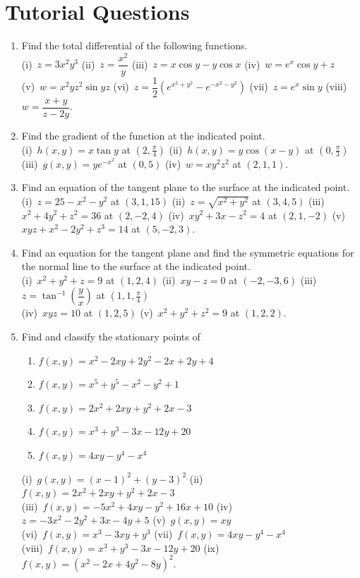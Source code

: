 \documentclass[titlepage,a4paper,12pt]{report}
\begin{document}
\section{Tutorial Questions}
\begin{enumerate}
\item Find the total differential of the following functions.\\
(i)\, $z=3x^2y^3$ \quad (ii)\, $z=\dfrac{x^2}{y}$ \quad (iii)\, $z=x\cos y-y\cos x $ \quad (iv)\, $w=e^x\cos y +z$ \\ (v)\, $w=x^2yz^2\sin yz$ \quad (vi)\, $z=\dfrac{1}{2}(e^{x^2+y^2}-e^{-x^2-y^2})$ \quad (vii)\, $z=e^x\sin y$ \quad (viii)\, $w=\dfrac{x+y}{z-2y}$.
\item Find the gradient of the function at the indicated point.\\
  (i)\, $h(x,y)=x\tan y$ at $(2, \frac{\pi}{4})$ \quad (ii)\, $h(x,y)=y\cos (x-y)$ at $(0, \frac{\pi}{3})$ \quad (iii)\, $g(x,y)=ye^{-x^2}$ at $(0,5)$ \quad (iv)\, $w=xy^2z^2$ at $(2,1,1)$.
  \item Find an equation of the tangent plane to the surface at the indicated point.\\
  (i)\, $z=25-x^2-y^2$ at $(3,1,15)$ \quad (ii)\, $z=\sqrt{x^2+y^2}$ at $(3,4,5)$ \quad (iii)\, $x^2+4y^2+z^2=36$ at $(2,-2,4)$ \quad (iv)\, $xy^2+3x-z^2=4$ at $(2,1,-2)$ \quad (v)\, $xyz+x^2-2y^2+z^3=14$ at $(5,-2,3)$.
  \item Find an equation for the tangent plane and find the symmetric equations for the normal line to the surface at the indicated point.\\
  (i)\, $x^2+y^2+z=9$ at $(1,2,4)$ \quad (ii)\, $xy-z=0$ at $(-2,-3, 6)$ \quad (iii)\,  $z=\tan ^{-1}\left(\dfrac{y}{x}\right)$ at $(1,1,\frac{\pi}{4})$\\
  (iv)\, $xyz=10$ at $(1,2,5)$ \quad (v)\, $x^2+y^2+z^2=9$ at $(1,2,2)$.
  \item Find and classify the stationary points of
  \begin{enumerate}
  \item $f(x,y)=x^2-2xy+2y^2-2x+2y+4$
  \item $f(x,y)=x^5+y^5-x^2-y^2+1$
  \item $f(x,y)=2x^2+2xy+y^2+2x-3$
  \item $f(x,y)=x^3+y^3-3x-12y+20$
  \item $f(x,y)=4xy-y^4-x^4$
  \end{enumerate}
  (i)\, $g(x,y)=(x-1)^2+(y-3)^2$ \quad (ii)\, $f(x,y)=2x^2+2xy+y^2+2x-3$ \\ (iii)\, $f(x,y)=-5x^2+4xy-y^2+16x+10$ \quad (iv)\, $z=-3x^2-2y^2+3x-4y+5$ \quad (v)\, $g(x,y)=xy$ \\ (vi)\, $f(x,y)=x^3-3xy+y^3$ \quad (vii)\, $f(x,y)=4xy-y^4-x^4$ \\ (viii)\, $f(x,y)=x^3+y^3-3x-12y+20$ \quad (ix)\, $f(x,y)=(x^2-2x+4y^2-8y)^2$.

\end{enumerate}
\end{document}
